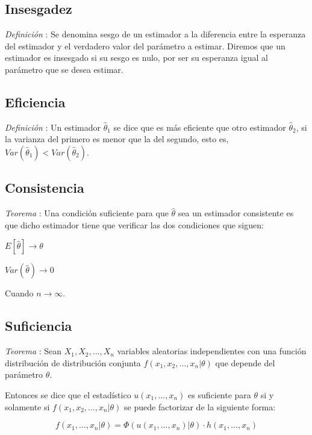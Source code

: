 \documentclass[a4paper, 10pt]{article} %
\newcounter{def}
\newcounter{teo}
\begin{document}
\subsection{Insesgadez}
\addtocounter{def}{1}
\emph{Definición }: Se denomina sesgo de un estimador a la diferencia entre la esperanza del estimador
y el verdadero valor del parámetro a estimar. Diremos que un estimador es insesgado si su sesgo es nulo, por ser
su esperanza igual al parámetro que se desea estimar.

\subsection{Eficiencia}
\addtocounter{def}{1}
\emph{Definición }: Un estimador $\hat{\theta}_1$ se dice que es más eficiente que otro estimador
$\hat{\theta}_2$, si la varianza del primero es menor que la del segundo, esto es,  $Var(\hat{\theta}_1)<Var(\hat{\theta}_2)$.

\subsection{Consistencia}
\addtocounter{teo}{1}
\emph{Teorema }: Una condición suficiente para que $\hat{\theta}$ sea un estimador consistente es que
dicho estimador tiene que verificar las dos condiciones que siguen:

\begin{description}
	\item $E[\hat{\theta}] \rightarrow \theta$
	\item $Var(\hat{\theta}) \rightarrow 0$
\end{description}

Cuando $n \rightarrow \infty$.

\subsection{Suficiencia}
\emph{Teorema }: Sean $X_1, X_2, ..., X_n$ variables aleatorias independientes con una función
distribución de distribución conjunta $f(x_1, x_2, ..., x_n | \theta)$ que depende del parámetro $\theta$.

Entonces se dice que el estadístico $u(x_1, ..., x_n)$ es suficiente para $\theta$ si y solamente si
$f(x_1, x_2,\dots, x_n | \theta)$ se puede factorizar de la siguiente forma:

$$ f(x_1,...,x_n| \theta) = \Phi(u(x_1, ..., x_n) | \theta)\cdot h(x_1, ..., x_n) $$
\end{document}
